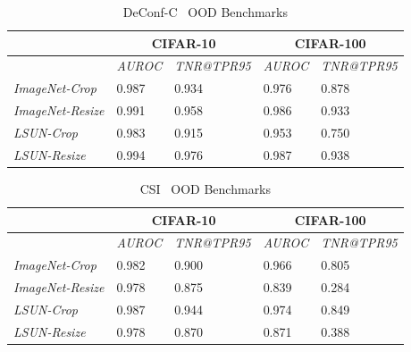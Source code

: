 \documentclass[accepted]{uai2022} %
\begin{document}
\begin{table}[t]
    \setlength\tabcolsep{4pt}
    \centering
    \caption{DeConf-C~\citep{Hsu:CVPR:2020:generalized} OOD Benchmarks}
        \label{Tab:ood_deconf}
         
        \begin{tabular}{@{}lllll@{}}
            \toprule
                                      & \multicolumn{2}{c}{CIFAR-10}      & \multicolumn{2}{c}{CIFAR-100}     \\ \midrule
                                      & \textit{AUROC} & \textit{TNR@TPR95} & \textit{AUROC} & \textit{TNR@TPR95} \\\midrule
            \textit{ImageNet-Crop}    &  0.987         &  0.934           & 0.976          & 0.878            \\
            \textit{ImageNet-Resize}  &  0.991         &  0.958           & 0.986          & 0.933            \\
            \textit{LSUN-Crop}        &  0.983         &  0.915           & 0.953          & 0.750            \\
            \textit{LSUN-Resize}      &  0.994         &  0.976           & 0.987          & 0.938            \\ \bottomrule
        \end{tabular}
    \end{table}




\begin{table}[t]
    \setlength\tabcolsep{4pt}
    \centering
    \caption{CSI~\citep{Tack:NIPS:2020:csi} OOD Benchmarks}
        \label{Tab:ood_csi}
         
        \begin{tabular}{@{}lllll@{}}
            \toprule
                                      & \multicolumn{2}{c}{CIFAR-10}      & \multicolumn{2}{c}{CIFAR-100}     \\ \midrule
                                      & \textit{AUROC} & \textit{TNR@TPR95} & \textit{AUROC} & \textit{TNR@TPR95} \\\midrule
            \textit{ImageNet-Crop}    & 0.982          & 0.900            & 0.966          & 0.805            \\
            \textit{ImageNet-Resize}  & 0.978          & 0.875            & 0.839          & 0.284            \\
            \textit{LSUN-Crop}        & 0.987          & 0.944            & 0.974          & 0.849            \\
            \textit{LSUN-Resize}      & 0.978          & 0.870            & 0.871          & 0.388            \\ \bottomrule
        \end{tabular}
    \end{table}
\end{document}
